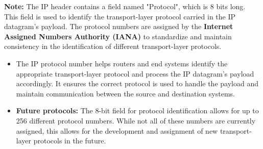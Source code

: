 \noindent \textbf{Note:} The IP header contains a field named "Protocol", which is 8 bits long. This field is used to identify the transport-layer protocol carried in the IP datagram's payload. The protocol numbers are assigned by the \textbf{Internet Assigned Numbers Authority (IANA)} to standardize and maintain consistency in the identification of different transport-layer protocols.

\vspace{-0.25em}
\begin{itemize}
    \item The IP protocol number helps routers and end systems identify the appropriate transport-layer protocol and process the IP datagram's payload accordingly. It ensures the correct protocol is used to handle the payload and maintain communication between the source and destination systems.

    \item \textbf{Future protocols:} The 8-bit field for protocol identification allows for up to 256 different protocol numbers. While not all of these numbers are currently assigned, this allows for the development and assignment of new transport-layer protocols in the future.
\end{itemize}

